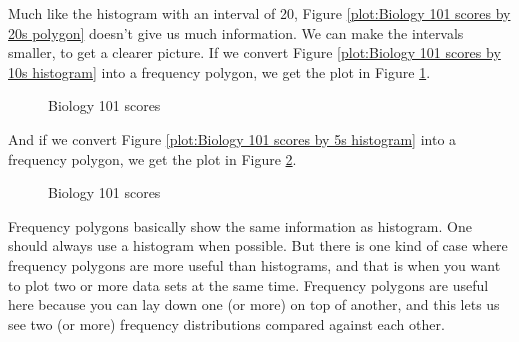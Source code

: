 \documentclass[../../../main.tex]{subfiles}
\begin{document}
Much like the histogram with an interval of 20, Figure \ref{plot:Biology 101 scores by 20s polygon} doesn't give us much information. We can make the intervals smaller, to get a clearer picture. If we convert Figure \ref{plot:Biology 101 scores by 10s histogram} into a frequency polygon, we get the plot in Figure \ref{plot:Biology 101 scores by 10s polygon}.

\begin{figure}[ht]
  \caption{\label{plot:Biology 101 scores by 10s polygon} Biology 101 scores}
\end{figure}

And if we convert Figure \ref{plot:Biology 101 scores by 5s histogram} into a frequency polygon, we get the plot in Figure \ref{plot:Biology 101 scores by 5s polygon}.

\begin{figure}[ht]
  \caption{\label{plot:Biology 101 scores by 5s polygon} Biology 101 scores}
\end{figure}

Frequency polygons basically show the same information as histogram. One should always use a histogram when possible. But there is one kind of case where frequency polygons are more useful than histograms, and that is when you want to plot two or more data sets at the same time. Frequency polygons are useful here because you can lay down one (or more) on top of another, and this lets us see two (or more) frequency distributions compared against each other.
\end{document}
